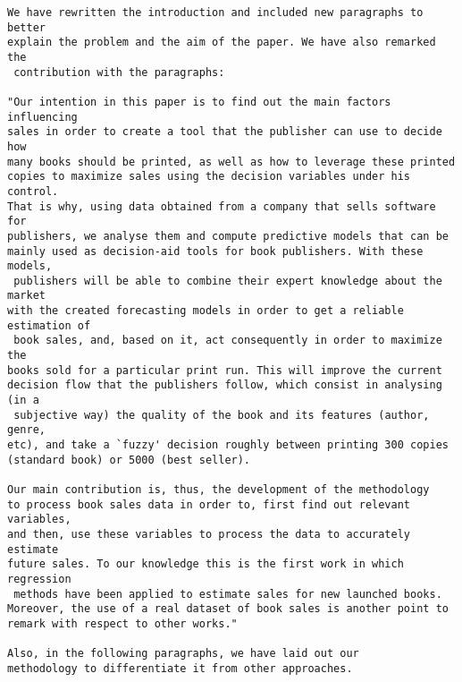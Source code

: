 \documentclass[preprint]{elsarticle}
\begin{document}
\begin{verbatim}
We have rewritten the introduction and included new paragraphs to better 
explain the problem and the aim of the paper. We have also remarked the
 contribution with the paragraphs:

"Our intention in this paper is to find out the main factors influencing
sales in order to create a tool that the publisher can use to decide how
many books should be printed, as well as how to leverage these printed
copies to maximize sales using the decision variables under his control. 
That is why, using data obtained from a company that sells software for 
publishers, we analyse them and compute predictive models that can be 
mainly used as decision-aid tools for book publishers. With these models,
 publishers will be able to combine their expert knowledge about the market 
with the created forecasting models in order to get a reliable estimation of
 book sales, and, based on it, act consequently in order to maximize the 
books sold for a particular print run. This will improve the current 
decision flow that the publishers follow, which consist in analysing (in a
 subjective way) the quality of the book and its features (author, genre, 
etc), and take a `fuzzy' decision roughly between printing 300 copies 
(standard book) or 5000 (best seller).

Our main contribution is, thus, the development of the methodology 
to process book sales data in order to, first find out relevant variables, 
and then, use these variables to process the data to accurately estimate 
future sales. To our knowledge this is the first work in which regression
 methods have been applied to estimate sales for new launched books. 
Moreover, the use of a real dataset of book sales is another point to 
remark with respect to other works."

Also, in the following paragraphs, we have laid out our 
methodology to differentiate it from other approaches.

\end{verbatim}
\end{document}
